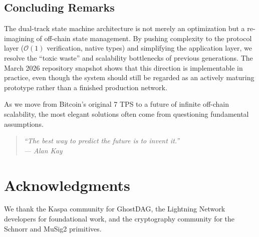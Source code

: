 \subsection{Concluding Remarks}

The dual-track state machine architecture is not merely an optimization but a re-imagining of off-chain state management. By pushing complexity to the protocol layer ($\mathcal{O}(1)$ verification, native types) and simplifying the application layer, we resolve the ``toxic waste'' and scalability bottlenecks of previous generations. The March 2026 repository snapshot shows that this direction is implementable in practice, even though the system should still be regarded as an actively maturing prototype rather than a finished production network.

As we move from Bitcoin's original 7 TPS to a future of infinite off-chain scalability, the most elegant solutions often come from questioning fundamental assumptions.

\begin{quote}
\centering
\itshape
``The best way to predict the future is to invent it.''\\
\upshape --- Alan Kay
\end{quote}

\section*{Acknowledgments}

We thank the Kaspa community for GhostDAG, the Lightning Network developers for foundational work, and the cryptography community for the Schnorr and MuSig2 primitives.
